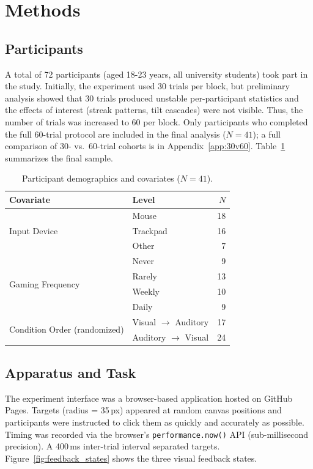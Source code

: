 \documentclass[12pt,letterpaper]{article}
\begin{document}
\section{Methods}

\subsection{Participants}

A total of 72 participants (aged 18-23 years, all university students) took part in the study. Initially, the experiment used 30 trials per block, but preliminary analysis showed that 30 trials produced unstable per-participant statistics and the effects of interest (streak patterns, tilt cascades) were not visible. Thus, the number of trials was increased to 60 per block. Only participants who completed the full 60-trial protocol are included in the final analysis ($N = 41$); a full comparison of 30- vs.\ 60-trial cohorts is in Appendix~\ref{app:30v60}. Table~\ref{tab:sample} summarizes the final sample.

\begin{table}[H]
\centering
\caption{Participant demographics and covariates ($N = 41$).}
\label{tab:sample}
\begin{tabular}{llr}
\toprule
\textbf{Covariate} & \textbf{Level} & \textbf{$N$} \\
\midrule
\multirow{3}{*}{Input Device} & Mouse & 18 \\
 & Trackpad & 16 \\
 & Other & 7 \\[4pt]
\multirow{4}{*}{Gaming Frequency} & Never & 9 \\
 & Rarely & 13 \\
 & Weekly & 10 \\
 & Daily & 9 \\[4pt]
\multirow{2}{*}{Condition Order (randomized)} & Visual $\to$ Auditory & 17 \\
 & Auditory $\to$ Visual & 24 \\
\bottomrule
\end{tabular}
\end{table}

\subsection{Apparatus and Task}

The experiment interface was a browser-based application hosted on GitHub Pages. Targets (radius = 35\,px) appeared at random canvas positions and participants were instructed to click them as quickly and accurately as possible. Timing was recorded via the browser's \texttt{performance.now()} API (sub-millisecond precision). A 400\,ms inter-trial interval separated targets. Figure~\ref{fig:feedback_states} shows the three visual feedback states.
\end{document}
